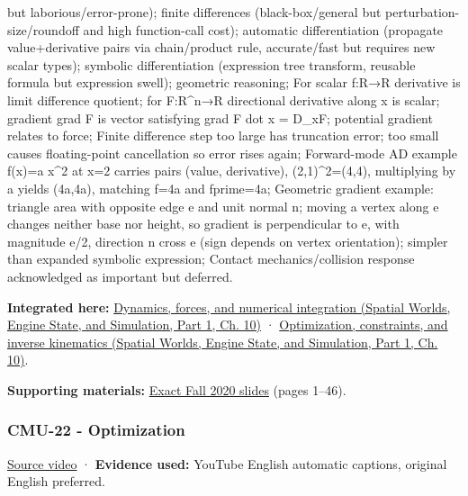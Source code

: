 but laborious/error-prone); finite differences (black-box/general but perturbation-size/roundoff and high function-call cost); automatic differentiation (propagate value+derivative pairs via chain/product rule, accurate/fast but requires new scalar types); symbolic differentiation (expression tree transform, reusable formula but expression swell); geometric reasoning; For scalar f:R→R derivative is limit difference quotient; for F:R\^{}n→R directional derivative along x is scalar; gradient grad F is vector satisfying grad F dot x = D\_xF; potential gradient relates to force; Finite difference step too large has truncation error; too small causes floating-point cancellation so error rises again; Forward-mode AD example f(x)=a x\^{}2 at x=2 carries pairs (value, derivative), (2,1)\^{}2=(4,4), multiplying by a yields (4a,4a), matching f=4a and fprime=4a; Geometric gradient example: triangle area with opposite edge e and unit normal n; moving a vertex along e changes neither base nor height, so gradient is perpendicular to e, with magnitude \textbar e\textbar/2, direction n cross e (sign depends on vertex orientation); simpler than expanded symbolic expression; Contact mechanics/collision response acknowledged as important but deferred.

\textbf{Integrated here:} \href{../05-Spatial-Worlds-Engine-State-and-Simulation-P01/main.pdf\#nameddest=04-visual-computing-ii-ch029-dynamics-forces-and-numerical-integration}{Dynamics, forces, and numerical integration (Spatial Worlds, Engine State, and Simulation, Part 1, Ch. 10)} · \href{../05-Spatial-Worlds-Engine-State-and-Simulation-P01/main.pdf\#nameddest=04-visual-computing-ii-ch029-optimization-constraints-and-inverse-kinematics}{Optimization, constraints, and inverse kinematics (Spatial Worlds, Engine State, and Simulation, Part 1, Ch. 10)}.

\textbf{Supporting materials:} \href{https://15462.courses.cs.cmu.edu/fall2020content/lectures/21_dynamicstimeintegration/21_dynamicstimeintegration_slides.pdf}{Exact Fall 2020 slides} (pages 1--46).

\subsubsection{CMU-22 - Optimization}\label{04-visual-computing-ii-ch036-cmu-22---optimization}

\hypertarget{04-visual-computing-ii-ch036-cmu-22---optimization}{}

\href{https://www.youtube.com/watch?v=sDAEFFoiKZ0}{Source video} · \textbf{Evidence used:} YouTube English automatic captions, original English preferred.

